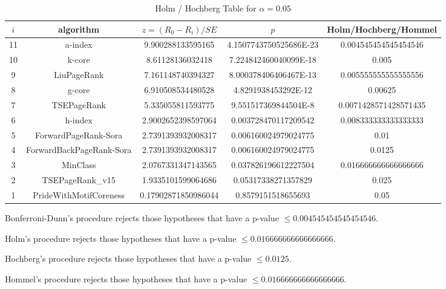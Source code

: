\documentclass[a4paper,10pt]{article}
\begin{document}
\begin{landscape}
\begin{table}[!htp]
\centering\tiny
\caption{Holm / Hochberg Table for $\alpha=0.05$}
\begin{tabular}{ccccc}
$i$&algorithm&$z=(R_0 - R_i)/SE$&$p$&Holm/Hochberg/Hommel\\
\hline
11&a-index&9.900288133595165&4.1507743750525686E-23&0.004545454545454546\\
10&k-core&8.61128136032418&7.224842460040099E-18&0.005\\
9&LiuPageRank&7.161148740394327&8.000378406406467E-13&0.005555555555555556\\
8&g-core&6.910508534480528&4.8291938453292E-12&0.00625\\
7&TSEPageRank&5.335055811593775&9.551517369844504E-8&0.0071428571428571435\\
6&h-index&2.9002652398597064&0.003728470117209542&0.008333333333333333\\
5&ForwardPageRank-Sora&2.7391393932008317&0.006160024979024775&0.01\\
4&ForwardBackPageRank-Sora&2.7391393932008317&0.006160024979024775&0.0125\\
3&MinClass&2.0767331347143565&0.037826196612227504&0.016666666666666666\\
2&TSEPageRank_v15&1.9335101599064686&0.05317338271357829&0.025\\
1&PrideWithMotifCoreness&0.17902871850986044&0.8579151518655693&0.05\\
\hline
\end{tabular}
\end{table}
Bonferroni-Dunn's procedure rejects those hypotheses that have a p-value $\le0.004545454545454546$.


Holm's procedure rejects those hypotheses that have a p-value $\le0.016666666666666666$.


Hochberg's procedure rejects those hypotheses that have a p-value $\le0.0125$.


Hommel's procedure rejects those hypotheses that have a p-value $\le0.016666666666666666$.



\end{landscape}
\end{document}
